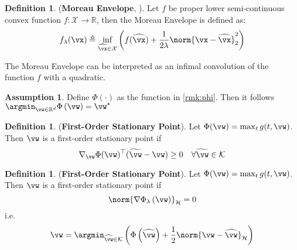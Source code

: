 \documentclass{article} %
\theoremstyle{plain}
\theoremstyle{definition}
\newtheorem{definition}[thm]{Definition}
\newtheorem{assumption}[thm]{Assumption}
\theoremstyle{remark}
\newcommand{\ccref}[1]{\textcolor{black}{\cref{#1}}}
\begin{document}
	\begin{definition}
		\label{def:moreau-envelope}
		(\textbf{Moreau Envelope}, \cite{moreau:1965}). Let $f$ be proper lower semi-continuous convex function $f: \mathcal{X} \to \mathbb{R}$, then the Moreau Envelope is defined as:
		\begin{equation}
			\label{eqn:moreau-envelope}
			f_{\lambda}(\vx) \triangleq \inf_{\widehat{\vx} \in \mathcal{X}}\left(f(\widehat{\vx}) + \frac{1}{2\lambda}\norm{\vx - \widehat{\vx}}_2^2\right)
		\end{equation}
	\end{definition}
	The Moreau Envelope can be interpreted as an infimal convolution of the function $f$ with a quadratic. 
	\begin{assumption}
		Define $\Phi(\cdot)$ as the function in \ccref{rmk:phi}. Then it follows $ \argmin_{\vw \in \mathbb{R}^d}\Phi\left(\vw\right) = \vw^{\star}$
	\end{assumption}
	\begin{definition}
		\label{def:stationary-point}
		(\textbf{First-Order Stationary Point}). Let $\Phi(\vw) = \max_t g(t,\vw)$. Then $\vw$ is a first-order stationary point if
		\begin{equation}
			\nabla_\vw \Phi(\vw)^\top (\widetilde{\vw} - \vw) \geq 0 \quad \forall \widetilde{\vw} \in \mathcal{K}
		\end{equation}
	\end{definition}
	\begin{definition}
		\label{def:stationary-point-2}
		(\textbf{First-Order Stationary Point}). Let $\Phi(\vw) = \max_t g(t,\vw)$. Then $\vw$ is a first-order stationary point if
		\begin{equation}
			\norm{\nabla\Phi_{\lambda}\left(\vw\right)}_{\mathcal{H}} = 0
		\end{equation}
		i.e.
		\begin{equation}
		\vw = \argmin_{\widehat{\vw} \in \mathcal{K}}\left(\Phi\left(\widehat{\vw}\right) + \frac{1}{2}\norm{\vw - \widehat{\vw}}_{\mathcal{H}}\right)
		\end{equation}
	\end{definition}
	
\end{document}
